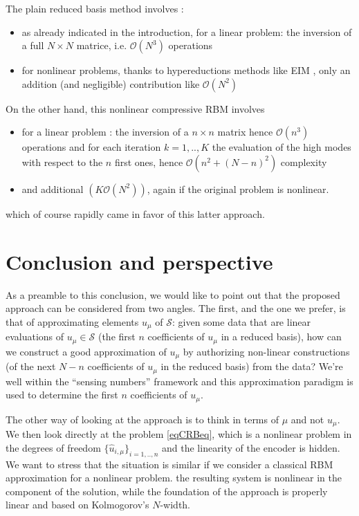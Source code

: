 \documentclass[graybox]{svmult}
\begin{document}
The plain reduced basis method involves :
\begin{itemize}
    \item as already indicated in the introduction, for a linear problem: the inversion of a full $N\times N$ matrice, i.e. ${\mathcal O}(N^3)$ operations
    \item for nonlinear problems, thanks to hypereductions methods like EIM \cite{EIM2004}, only an addition (and negligible) contribution like ${\mathcal O}(N^2)$ 
\end{itemize}
On the other hand, this nonlinear compressive RBM involves
\begin{itemize}
    \item for a linear problem : the inversion of a $n\times n$ matrix hence ${\mathcal O}(n^3)$ operations and for each iteration $k=1,..,K$ the evaluation of the high modes with respect to the $n$ first ones, hence ${\mathcal O}(n^2 + (N-n)^2)$ complexity
    \item and additional $(K {\mathcal O}( N^2))$, again if the original problem is nonlinear.
\end{itemize}
which of course rapidly came in favor of this latter approach.


\section{Conclusion and perspective}
\label{sec:Conclusion}



As a preamble to this conclusion, we would like to point out that the proposed approach can be considered from two angles. The first, and the one we prefer, is that of approximating elements $u_\mu$ of ${\mathcal S}$: given some data that are linear evaluations of $u_\mu \in {\mathcal S}$ (the first $n$ coefficients of $u_\mu$ in a reduced basis), how can we construct a good approximation of $u_\mu$ by authorizing non-linear constructions (of the next $N-n$ coefficients of $u_\mu$ in the reduced basis) from the data? We're well within the “sensing numbers” framework and this approximation paradigm is used to determine the first $n$ coefficients of $u_\mu$. 

The other way of looking at the approach is to think in terms of $\mu$ and not $u_\mu$. We then look directly at the problem \eqref{eqCRBeq}, which is a nonlinear problem in the degrees of freedom $\{\hat u_{i,\mu}\}_{i=1,..,n}$ and the linearity of the encoder is hidden. We want to stress that the situation is similar if we consider a classical RBM approximation for a nonlinear problem. the resulting system is nonlinear in the component of the solution, while the foundation of the approach is properly linear and based on Kolmogorov's $N$-width.
\end{document}

